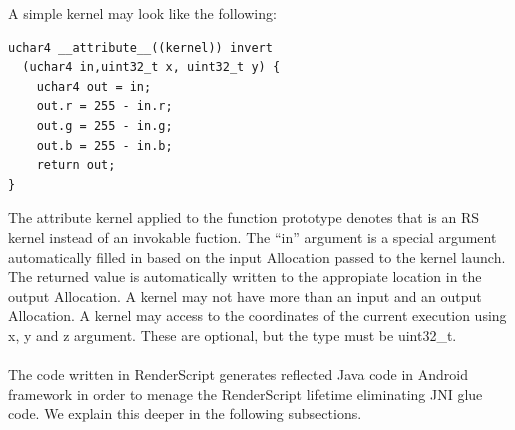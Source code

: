\documentclass[a4paper,10pt]{article}
\begin{document}
\begin{multicols}{2}
A simple kernel may look like the following:
\begin{lstlisting}[frame=single]
uchar4 __attribute__((kernel)) invert
  (uchar4 in,uint32_t x, uint32_t y) {
	uchar4 out = in;
	out.r = 255 - in.r;
	out.g = 255 - in.g;
	out.b = 255 - in.b;
	return out;
}
\end{lstlisting}
The attribute kernel applied to the function prototype denotes that is an RS kernel instead of an invokable fuction. The ``in'' argument is a special argument automatically filled in based on the input Allocation passed to the kernel launch. The returned value is automatically written to the appropiate location in the output Allocation.
A kernel may not have more than an input and an output Allocation.
A kernel may access to the coordinates of the current execution using x, y and z argument. These are optional, but the type must be uint32\_t.
\\\\
The code written in RenderScript generates reflected Java code in Android framework in order to menage the RenderScript lifetime eliminating JNI glue code. We explain this deeper in the following subsections.


\end{multicols}
\end{document}
